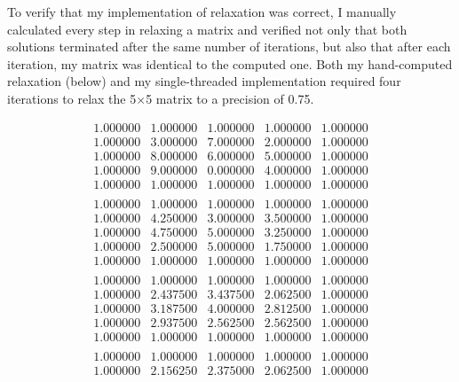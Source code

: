 \documentclass[12pt]{article}
\begin{document}
To verify that my implementation of relaxation was correct, I manually calculated every step in relaxing a matrix and verified not only that both solutions terminated after the same number of iterations, but also that after each iteration, my matrix was identical to the computed one. Both my hand-computed relaxation (below) and my single-threaded implementation required four iterations to relax the 5$\times$5 matrix to a precision of 0.75.
\hspace{-0.2cm}\begin{minipage}{.5\textwidth}
$$
\begin{matrix}
1.000000 & 1.000000 & 1.000000 & 1.000000 & 1.000000 \\
1.000000 & 3.000000 & 7.000000 & 2.000000 & 1.000000 \\
1.000000 & 8.000000 & 6.000000 & 5.000000 & 1.000000 \\
1.000000 & 9.000000 & 0.000000 & 4.000000 & 1.000000 \\
1.000000 & 1.000000 & 1.000000 & 1.000000 & 1.000000 \\
\end{matrix}
$$
$$
\begin{matrix}
1.000000 & 1.000000 & 1.000000 & 1.000000 & 1.000000 \\
1.000000 & 4.250000 & 3.000000 & 3.500000 & 1.000000 \\
1.000000 & 4.750000 & 5.000000 & 3.250000 & 1.000000 \\
1.000000 & 2.500000 & 5.000000 & 1.750000 & 1.000000 \\
1.000000 & 1.000000 & 1.000000 & 1.000000 & 1.000000 \\
\end{matrix}
$$
$$
\begin{matrix}
1.000000 & 1.000000 & 1.000000 & 1.000000 & 1.000000 \\ 
1.000000 & 2.437500 & 3.437500 & 2.062500 & 1.000000 \\ 
1.000000 & 3.187500 & 4.000000 & 2.812500 & 1.000000 \\ 
1.000000 & 2.937500 & 2.562500 & 2.562500 & 1.000000 \\ 
1.000000 & 1.000000 & 1.000000 & 1.000000 & 1.000000 \\ 
\end{matrix}
$$
$$
\begin{matrix}
1.000000 & 1.000000 & 1.000000 & 1.000000 & 1.000000 \\ 
1.000000 & 2.156250 & 2.375000 & 2.062500 & 1.000000 \\ 

\end{matrix}$$
\end{minipage}
\end{document}
